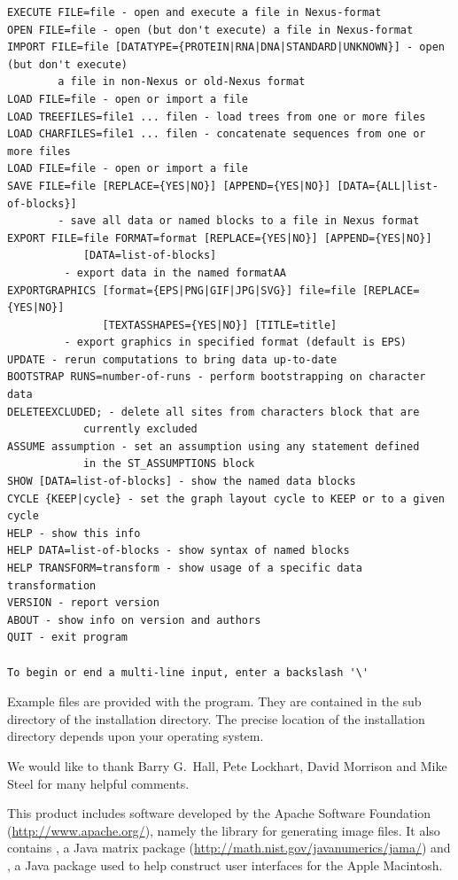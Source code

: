 \documentclass[11pt]{article}
\begin{document}
\begin{verbatim}
EXECUTE FILE=file - open and execute a file in Nexus-format
OPEN FILE=file - open (but don't execute) a file in Nexus-format
IMPORT FILE=file [DATATYPE={PROTEIN|RNA|DNA|STANDARD|UNKNOWN}] - open (but don't execute)
 		a file in non-Nexus or old-Nexus format
LOAD FILE=file - open or import a file
LOAD TREEFILES=file1 ... filen - load trees from one or more files
LOAD CHARFILES=file1 ... filen - concatenate sequences from one or more files
LOAD FILE=file - open or import a file
SAVE FILE=file [REPLACE={YES|NO}] [APPEND={YES|NO}] [DATA={ALL|list-of-blocks}]
        - save all data or named blocks to a file in Nexus format
EXPORT FILE=file FORMAT=format [REPLACE={YES|NO}] [APPEND={YES|NO}]
            [DATA=list-of-blocks]
         - export data in the named formatAA
EXPORTGRAPHICS [format={EPS|PNG|GIF|JPG|SVG}] file=file [REPLACE={YES|NO}]
               [TEXTASSHAPES={YES|NO}] [TITLE=title]
         - export graphics in specified format (default is EPS)
UPDATE - rerun computations to bring data up-to-date
BOOTSTRAP RUNS=number-of-runs - perform bootstrapping on character data
DELETEEXCLUDED; - delete all sites from characters block that are
            currently excluded
ASSUME assumption - set an assumption using any statement defined
            in the ST_ASSUMPTIONS block
SHOW [DATA=list-of-blocks] - show the named data blocks
CYCLE {KEEP|cycle} - set the graph layout cycle to KEEP or to a given cycle
HELP - show this info
HELP DATA=list-of-blocks - show syntax of named blocks
HELP TRANSFORM=transform - show usage of a specific data transformation
VERSION - report version
ABOUT - show info on version and authors
QUIT - exit program

To begin or end a multi-line input, enter a backslash '\'
\end{verbatim}


Example files are provided with the program. They are contained in the
 sub directory of the installation directory. The precise
location of the installation directory depends upon your operating system.


We would like to thank Barry G.~Hall, Pete Lockhart, David Morrison
and Mike Steel for many helpful comments.

This product includes  software developed  by the  Apache Software Foundation
(\url{http://www.apache.org/}), namely the  library for
generating image files. It also contains , a Java matrix
package (\url{http://math.nist.gov/javanumerics/jama/}) and , a Java
package used to help construct user interfaces for the Apple Macintosh.





\printindex
\end{document}
